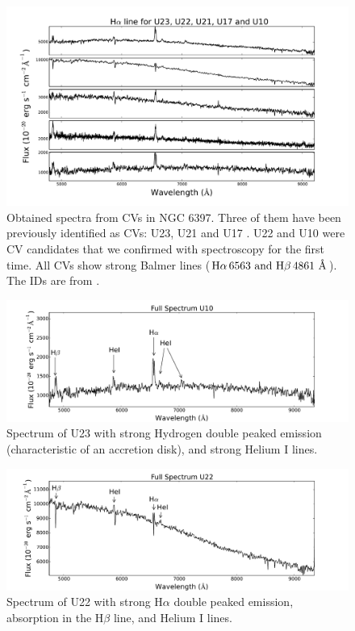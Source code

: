 \begin{figure}[]
        \centering
        \includegraphics[scale=.6]{assets/images/todostodos.pdf}
        \caption[Obtained spectra from CVs in NGC 6397]{Obtained spectra from CVs in NGC 6397. Three of them have been previously identified as CVs: U23, U21 and U17 \citep{grindlay_spectroscopic_1995,edmonds_cataclysmic_1999}. U22 and  U10 were CV candidates that we confirmed with spectroscopy for the first time. All CVs show strong Balmer lines ($ \text H \alpha \, 6563 \text{ and H}\beta \,  4861 \text{ \r A}$). The IDs are from \cite{bogdanov_chandra_2010}.}
\label{fig:todosspectra}
\end{figure}

\begin{figure}[]
        \centering
        \includegraphics[scale=.5]{assets/images/U10full.pdf}
        \caption[Spectrum of U23]{Spectrum of U23 with strong Hydrogen double peaked emission (characteristic of an accretion disk), and strong Helium I lines. }
\label{fig:U10spectra}
\end{figure}

\begin{figure}[]
        \centering
        \includegraphics[scale=.5]{assets/images/U22full.pdf}
        \caption[Spectrum of U22]{Spectrum of U22 with strong H$\alpha$ double peaked emission, absorption in the H$\beta$ line, and Helium I lines.}
\label{fig:U22spectra}
\end{figure}


